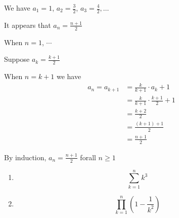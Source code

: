 \begin{solution}
We have $a_1 = 1$, $a_2 = \displaystyle \frac{3}{2}$, $a_3 = \displaystyle \frac{4}{2}, \dots$

It appears that $\displaystyle a_n = \frac{n+1}{2}$

When $n=1$, $\cdots$

Suppose $\displaystyle a_k = \frac{k+1}{2}$

When $n = k+1$ we have 
\begin{align*}
   a_n = a_{k+1} &= \frac{k}{k+1}\cdot a_k +1\\
    &= \frac{k}{k+1} \cdot \frac{k+1}{2} +1 \\
    & = \frac{k+2}{2} \\
    & = \frac{(k+1)+1}{2} \\
    & =\frac{n+1}{2}
\end{align*}

By induction, $\displaystyle a_n = \frac{n+1}{2}$ forall $n\geq 1$


\end{solution}

\begin{exer}
\leavevmode
\begin{enumerate}
\item 
\[
\sum_{k=1}^n k^3
\]
\item
\[
\prod_{k=1}^n (1-\frac{1}{k^2})
\]
\end{enumerate}

\end{exer}



